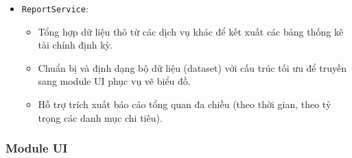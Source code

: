 \documentclass[12pt,letterpaper]{article}
\begin{document}
\begin{itemize}
\begin{itemize}
\begin{itemize}
            \item Đánh giá tỷ lệ chi tiêu và tạo dữ liệu cảnh báo trạng thái (over\_budget) khi tổng chi vượt quá hạn mức ngân sách đã thiết lập.
        \end{itemize}
        \item \texttt{ReportService}:
        \begin{itemize}
            \item Tổng hợp dữ liệu thô từ các dịch vụ khác để kết xuất các bảng thống kê tài chính định kỳ.
            \item Chuẩn bị và định dạng bộ dữ liệu (dataset) với cấu trúc tối ưu để truyền sang module UI phục vụ vẽ biểu đồ.
            \item Hỗ trợ trích xuất báo cáo tổng quan đa chiều (theo thời gian, theo tỷ trọng các danh mục chi tiêu).
        \end{itemize}
    \end{itemize}
\end{itemize}
\subsubsection{Module UI}
\end{document}
